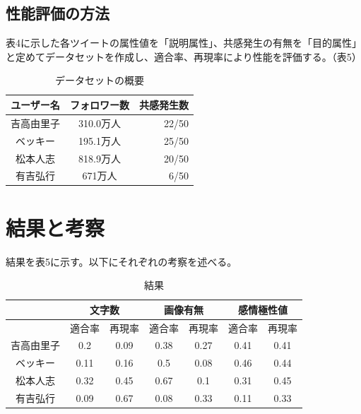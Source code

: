 \documentclass[dvipdfmx]{issj}
\begin{document}
\subsection{性能評価の方法}  %
表4に示した各ツイートの属性値を「説明属性」、共感発生の有無を「目的属性」と定めてデータセットを作成し、適合率、再現率により性能を評価する。（表5）


\begin{table}[t]
  \caption{データセットの概要}
  \label{table:data_type}
  \centering
  \begin{tabular}{c|c|r}
    \hline\hline
   ユーザー名 & フォロワー数  &  共感発生数  \\
    \hline 
吉高由里子 & 310.0万人 &  22/50  \\
ベッキー & 195.1万人 &  25/50  \\
松本人志 & 818.9万人 &  20/50  \\
有吉弘行 & 671万人 &  6/50 \\
    \hline
  \end{tabular}
\end{table}





\section{結果と考察}  %
結果を表5に示す。以下にそれぞれの考察を述べる。


\begin{table}[t]
\centering
  \caption{結果}
  \begin{tabular}{c|c|c|c|c|c|c}  \hline\hline
 &  \multicolumn{2}{|c|}{文字数} &  \multicolumn{2}{|c|}{画像有無} &  \multicolumn{2}{|c|}{感情極性値} \\ \hline
&適合率 & 再現率 & 適合率 & 再現率 &適合率 & 再現率 \\\hline
吉高由里子 & 0.2&0.09 &0.38&0.27 & 0.41&0.41 \\
ベッキー& 0.11&0.16 &0.5&0.08& 0.46&0.44 \\
松本人志& 0.32&0.45 & 0.67&0.1 &0.31&0.45\\
有吉弘行& 0.09&0.67 & 0.08&0.33 &  0.11&0.33 \\ \hline

  \end{tabular}
\end{table}
\end{document}

